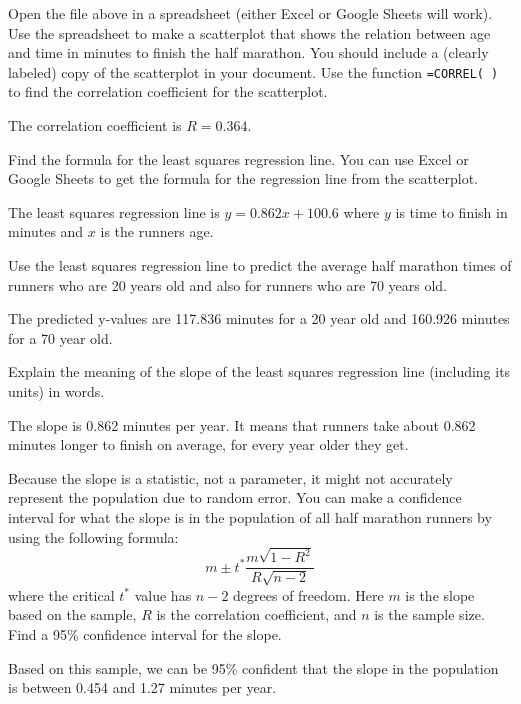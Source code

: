 \documentclass[12pt]{exam}
\begin{document}
\begin{questions}

\question Open the file above in a spreadsheet (either Excel or Google Sheets will work). Use the spreadsheet to make a scatterplot that shows the relation between age and time in minutes to finish the half marathon. You should include a (clearly labeled) copy of the scatterplot in your document.  
\question Use the function \verb|=CORREL( )| to find the correlation coefficient for the scatterplot. 
\begin{solution}
The correlation coefficient is $R = 0.364$. 
\end{solution}
\question Find the formula for the least squares regression line.  You can use Excel or Google Sheets to get the formula for the regression line from the scatterplot.
\begin{solution}
The least squares regression line is $y = 0.862x+100.6$ where $y$ is time to finish in minutes and $x$ is the runners age.   
\end{solution}
\question Use the least squares regression line to predict the average half marathon times of runners who are 20 years old and also for runners who are 70 years old.  
\begin{solution}
The predicted y-values are 117.836 minutes for a 20 year old and 160.926 minutes for a 70 year old. 
\end{solution}
\question Explain the meaning of the slope of the least squares regression line (including its units) in words. 
\begin{solution}
The slope is 0.862 minutes per year.  It means that runners take about 0.862 minutes longer to finish on average, for every year older they get. 
\end{solution}
\question Because the slope is a statistic, not a parameter, it might not accurately represent the population due to random error.  You can make a confidence interval for what the slope is in the population of all half marathon runners by using the following formula:  
$$m \pm t^*  \frac{m \sqrt{1-R^2}}{R \sqrt{n-2}}$$
where the critical $t^*$ value has $n-2$ degrees of freedom.  Here $m$ is the slope based on the sample, $R$ is the correlation coefficient, and $n$ is the sample size. Find a 95\% confidence interval for the slope.   
\begin{solution}
Based on this sample, we can be 95\% confident that the slope in the population is between 0.454 and 1.27 minutes per year. 
\end{solution}




\end{questions}
\end{document}
